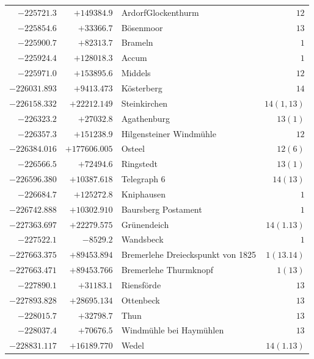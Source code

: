 \begin{center}
\begin{tabular}{r|r|p{170pt}|r}
\(-225721.3\)&\(+149384.9\)&ArdorfGlockenthurm&\(12\)\\
\(-225854.6\)&\(+33366.7\)&Bösenmoor&\(13\)\\
\(-225900.7\)&\(+82313.7\)&Brameln&\(1\)\\
\(-225924.4\)&\(+128018.3\)&Accum&\(1\)\\
\(-225971.0\)&\(+153895.6\)&Middels&\(12\)\\
\(-226031.893\)&\(+9413.473\)&Kösterberg&\(14\)\\
\(-226158.332\)&\(+22212.149\)&Steinkirchen&\(14(1,13)\)\\
\(-226323.2\)&\(+27032.8\)&Agathenburg&\(13(1)\)\\
\(-226357.3\)&\(+151238.9\)&Hilgensteiner Windmühle&\(12\)\\
\(-226384.016\)&\(+177606.005\)&Osteel&\(12(6)\)\\
\(-226566.5\)&\(+72494.6\)&Ringstedt&\(13(1)\)\\
\(-226596.380\)&\(+10387.618\)&Telegraph 6&\(14(13)\)\\
\(-226684.7\)&\(+125272.8\)&Kniphausen&\(1\)\\
\(-226742.888\)&\(+10302.910\)&Baursberg Postament&\(1\)\\
\(-227363.697\)&\(+22279.575\)&Grünendeich&\(14(1.13)\)\\
\(-227522.1\)&\(-8529.2\)&Wandsbeck&\(1\)\\
\(-227663.375\)&\(+89453.894\)&Bremerlehe Dreieckspunkt von 1825&\(1(13.14)\)\\
\(-227663.471\)&\(+89453.766\)&Bremerlehe Thurmknopf&\(1(13)\)\\
\(-227890.1\)&\(+31183.1\)&Riensförde&\(13\)\\
\(-227893.828\)&\(+28695.134\)&Ottenbeck&\(13\)\\
\(-228015.7\)&\(+32798.7\)&Thun&\(13\)\\
\(-228037.4\)&\(+70676.5\)&Windmühle bei Haymühlen&\(13\)\\
\(-228831.117\)&\(+16189.770\)&Wedel&\(14(1.13)\)\\
\hline\end{tabular}\endgroup\end{center}
\clearpage
